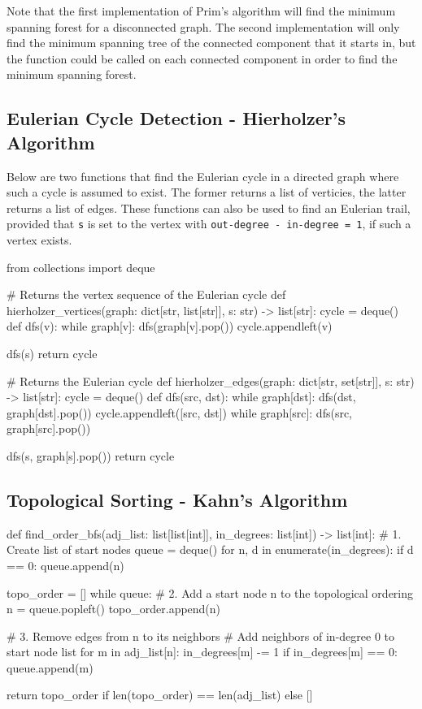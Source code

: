 \documentclass[12pt, titlepage]{article}
\begin{document}
Note that the first implementation of Prim's algorithm will find the minimum spanning forest for a disconnected graph. The second implementation will only find the minimum spanning tree of the connected component that it starts in, but the function could be called on each connected component in order to find the minimum spanning forest.

\subsection{Eulerian Cycle Detection - Hierholzer's Algorithm}

Below are two functions that find the Eulerian cycle in a directed graph where such a cycle is assumed to exist. The former returns a list of verticies, the latter returns a list of edges. These functions can also be used to find an Eulerian trail, provided that \texttt{s} is set to the vertex with \texttt{out-degree - in-degree = 1}, if such a vertex exists. \medskip

\begin{python}
from collections import deque

# Returns the vertex sequence of the Eulerian cycle
def hierholzer_vertices(graph: dict[str, list[str]], s: str) -> list[str]:
    cycle = deque()
    def dfs(v):
        while graph[v]:
            dfs(graph[v].pop())
        cycle.appendleft(v)

    dfs(s)
    return cycle


# Returns the Eulerian cycle
def hierholzer_edges(graph: dict[str, set[str]], s: str) -> list[str]:
    cycle = deque()
    def dfs(src, dst):
        while graph[dst]:
            dfs(dst, graph[dst].pop())
        cycle.appendleft([src, dst])
        while graph[src]:
            dfs(src, graph[src].pop())

    dfs(s, graph[s].pop())
    return cycle
\end{python}

\subsection{Topological Sorting - Kahn's Algorithm}
\begin{python}
def find_order_bfs(adj_list: list[list[int]],
                   in_degrees: list[int]) -> list[int]:
    # 1. Create list of start nodes
    queue = deque()
    for n, d in enumerate(in_degrees):
        if d == 0:
            queue.append(n)

    topo_order = []
    while queue:
        # 2. Add a start node n to the topological ordering
        n = queue.popleft()
        topo_order.append(n)

        # 3. Remove edges from n to its neighbors
        #    Add neighbors of in-degree 0 to start node list
        for m in adj_list[n]:
            in_degrees[m] -= 1
            if in_degrees[m] == 0:
                queue.append(m)

    return topo_order if len(topo_order) == len(adj_list) else []
\end{python}
\end{document}
